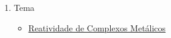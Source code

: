 \documentclass{article}
\begin{document}
{\begin{multicols}{2}
\begin{enumerate}
\begin{itemize}[leftmargin=0mm]
	\end{itemize}
	
	
	\item Tema
	\begin{itemize}[leftmargin=0mm]
		
		\item \hyperref[reatividade]
			 {Reatividade de Complexos Metálicos}
		
	\end{itemize}


\end{enumerate}
\end{multicols}

}

\restoregeometry
\end{document}
